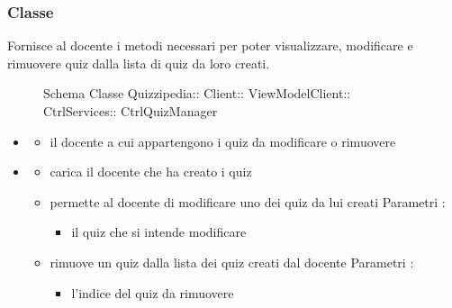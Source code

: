 \subsubsection{Classe }
Fornisce al docente i metodi necessari per poter visualizzare, modificare e rimuovere quiz dalla lista di quiz da loro creati.
\begin{figure}[H]
\centering
\noindent{}
\caption[Schema Classe CtrlQuizManager]{Schema Classe Quizzipedia:: Client:: ViewModelClient:: CtrlServices:: CtrlQuizManager}
\end{figure}
\begin{itemize}
\item {}
\begin{itemize}
\item {}
\newline
il docente a cui appartengono i quiz da modificare o rimuovere
\end{itemize}
\item {}
\begin{itemize}
\item {}
\newline
carica il docente che ha creato i quiz
\newline
\item {}
\newline
permette al docente di modificare uno dei quiz da lui creati
\newline
Parametri :
\begin{itemize}
\item {}
\newline
il quiz che si intende modificare
\end{itemize}
\item {}
\newline
rimuove un quiz dalla lista dei quiz creati dal docente
\newline
Parametri :
\begin{itemize}
\item {}
\newline
l'indice del quiz da rimuovere
\end{itemize}
\end{itemize}
\end{itemize}
